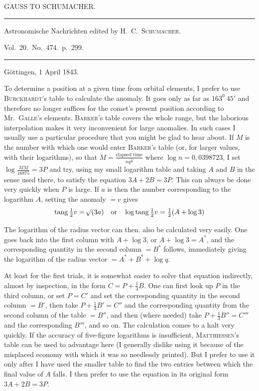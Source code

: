 \clearpage{}%
\begin{center}
{\small GAUSS TO SCHUMACHER.\par}
\medskip\hrule\medskip
{\small Astronomische Nachrichten edited by H.\ C.\ \textsc{Schumacher}.\par
Vol.\ 20.\ No.\ 474.\ p.\ 299.\par}
\medskip\hrule
\end{center}\medskip
\begin{flushright}Göttingen, 1 April 1843.\end{flushright}
To determine a position at a given time from orbital elements, I prefer to use \textsc{Burckhardt}’s table to calculate the anomaly. It goes only as far as $163^0\ 45'$ and therefore no longer suffices for the comet’s present position according to Mr.\ \textsc{Galle}’s elements. \textsc{Barker}’s table covers the whole range, but the laborious interpolation makes it very inconvenient for large anomalies. In such cases I usually use a particular procedure that you might be glad to hear about. If $M$ is the number with which one would enter \textsc{Barker}’s table (or, for larger values, with their logarithms), so that $M=\frac{\text{elapsed time}}{nq^{\frac32}}$ where $\log n=0{,}0398723$, I set $\log\frac{MM}{16875}=3P$ and try, using my small logarithm table and taking $A$ and $B$ in the sense used there, to satisfy the equation $3A+2B=3P$. This can always be done very quickly when $P$ is large. If $a$ is then the number corresponding to the logarithm $A$, setting the anomaly $=v$ gives
\[
\operatorname{tang}\tfrac12v=\mathord{{}^{}\!\surd}(3a)\quad\text{or}\quad
\log\operatorname{tang}\tfrac12v=\tfrac12(A+\log3)
\]

The logarithm of the radius vector can then. also be calculated very easily. One goes back into the first column with $A+\log3$, or $A+\log3=A^*$, and the corresponding quantity in the second column $=B^*$ follows, immediately giving the logarithm of the radius vector $=A^*+B^*+\log q$.

%
At least for the first trials, it is somewhat easier to solve that equation indirectly, almost by inspection, in the form $C=P+\frac13B$. One can first look up $P$ in the third column, or set $P=C'$ and set the corresponding quantity in the second column $=B'$, then take $P+\frac13B'=C''$ and the corresponding quantity from the second column of the table $=B''$, and then (where needed) take $P+\frac13B''=C'''$ and the corresponding $B'''$, and so on. The calculation comes to a halt very quickly. If the accuracy of five-figure logarithms is insufficient, \textsc{Matthiessen}’s table can be used to advantage here (I generally dislike using it because of the misplaced economy with which it was so needlessly printed). But I prefer to use it only after I have used the smaller table to find the two entries between which the final value of $A$ falls. I then prefer to use the equation in its original form $3A+2B=3P$.

